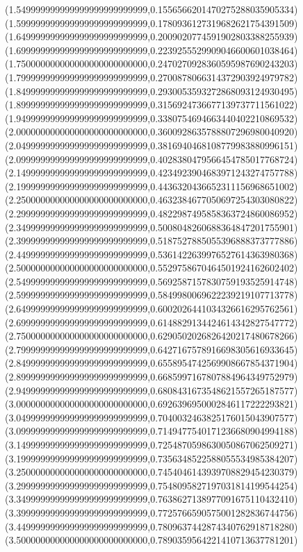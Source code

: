 \documentclass[11pt]{report}
\begin{document}
\begin{center}
  (1.549999999999999999999999999,0.1556566201470275288035905334)
  (1.599999999999999999999999999,0.1780936127319682621754391509)
  (1.649999999999999999999999999,0.2009020774591902803388255939)
  (1.699999999999999999999999999,0.2239255529909046600601038464)
  (1.750000000000000000000000000,0.2470270928360595987690243203)
  (1.799999999999999999999999999,0.2700878066314372903924979782)
  (1.849999999999999999999999999,0.2930053593272868093124930495)
  (1.899999999999999999999999999,0.3156924736677139737711561022)
  (1.949999999999999999999999999,0.3380754694663440402210869532)
  (2.000000000000000000000000000,0.3600928635788807296980040920)
  (2.049999999999999999999999999,0.3816940468108779983880996151)
  (2.099999999999999999999999999,0.4028380479566454785017768724)
  (2.149999999999999999999999999,0.4234923904683971243274757788)
  (2.199999999999999999999999999,0.4436320436652311156968651002)
  (2.250000000000000000000000000,0.4632384677050697254303080822)
  (2.299999999999999999999999999,0.4822987495858363724860086952)
  (2.349999999999999999999999999,0.5008048260688364847201755901)
  (2.399999999999999999999999999,0.5187527885055396888373777886)
  (2.449999999999999999999999999,0.5361422639976527614363980368)
  (2.500000000000000000000000000,0.5529758670464501924162602402)
  (2.549999999999999999999999999,0.5692587157830759193525914748)
  (2.599999999999999999999999999,0.5849980069622239219107713778)
  (2.649999999999999999999999999,0.6002026441034326616295762561)
  (2.699999999999999999999999999,0.6148829134424614342827547772)
  (2.750000000000000000000000000,0.6290502026826420217480678266)
  (2.799999999999999999999999999,0.6427167578916698305616933645)
  (2.849999999999999999999999999,0.6558954742569908667854371904)
  (2.899999999999999999999999999,0.6685997167807884964349752979)
  (2.949999999999999999999999999,0.6808431673548621557265187577)
  (3.000000000000000000000000000,0.6926396950002846117222293821)
  (3.049999999999999999999999999,0.7040032463825176015043907577)
  (3.099999999999999999999999999,0.7149477540171236680904994188)
  (3.149999999999999999999999999,0.7254870598630050867062509271)
  (3.199999999999999999999999999,0.7356348522588055534985384207)
  (3.250000000000000000000000000,0.7454046143939708829454230379)
  (3.299999999999999999999999999,0.7548095827197031814199544254)
  (3.349999999999999999999999999,0.7638627138977091675110432410)
  (3.399999999999999999999999999,0.7725766590575001282836744756)
  (3.449999999999999999999999999,0.7809637442874340762918718280)
  (3.500000000000000000000000000,0.7890359564221410713637781201)

\end{center}
\end{document}
